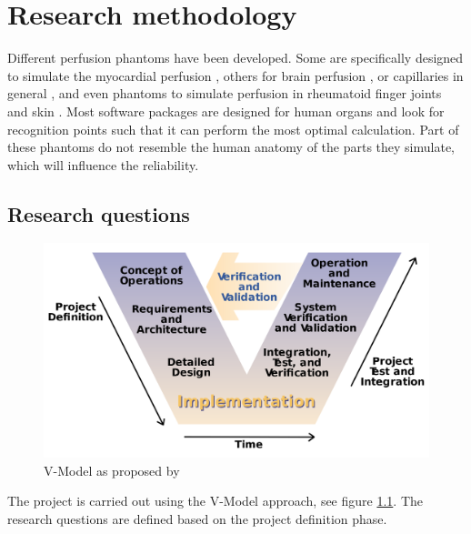 \chapter{Research methodology}
\label{ch:res_metho}

Different perfusion phantoms have been developed. Some are specifically designed to simulate the myocardial perfusion \citep{chiribiri2013perfusion, otton2013direct, o2017effect, o2017feasibility, teslow1991x}, others for brain perfusion \citep{hashimoto2018effect, suzuki2017quantitative, boese2013performance, mathys2012phantom, ebrahimi2010microfabricated, wang2010flow, noguchi2007quantitative, ganguly2012vitro, klotz1999perfusion}, or capillaries in general \citep{kim2016efficiency, anderson2011semipermeable, driscoll2011development, gauthier2011perfusion, veltmann2002design, lohmaier2004vitro}, and even phantoms to simulate perfusion in rheumatoid finger joints \citep{sakano2015power} and skin \citep{kim2018multidimensional}. Most software packages are designed for human organs and look for recognition points such that it can perform the most optimal calculation. Part of these phantoms do not resemble the human anatomy of the parts they simulate, which will influence the reliability.

\section{Research questions}
\begin{figure}[b!]
	\begin{center}
		\includegraphics[width=0.5\linewidth]{images/vmodel.png}
	\end{center}
	\caption{V-Model as proposed by \cite{osborne2005clarus}}
	\label{fig:vmodel}
\end{figure}

The project is carried out using the V-Model \citep{osborne2005clarus} approach, see figure \ref{fig:vmodel}. The research questions are defined based on the project definition phase.

